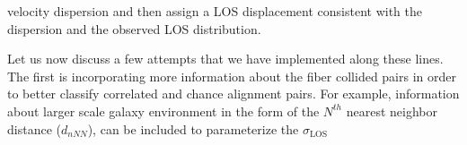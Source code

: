                                                                                                                                                                                                                                                                          velocity dispersion and then assign a LOS displacement consistent 
                                                                                                                                                                                                                                                                         with the dispersion and the observed LOS distribution. 

                                                                                                                                                                                                                                                                         Let us now discuss a few attempts that we have implemented along these lines. 
                                                                                                                                                                                                                                                                         The first is incorporating more information about the fiber collided pairs 
                                                                                                                                                                                                                                                                         in order to better classify 
                                                                                                                                                                                                                                                                         correlated and chance alignment pairs. For example, information about 
                                                                                                                                                                                                                                                                         larger scale galaxy environment in the form of the $N^{th}$ nearest neighbor 
                                                                                                                                                                                                                                                                         distance ($d_{nNN}$), can be included to parameterize the $\sigma_\mathrm{LOS}$ 
